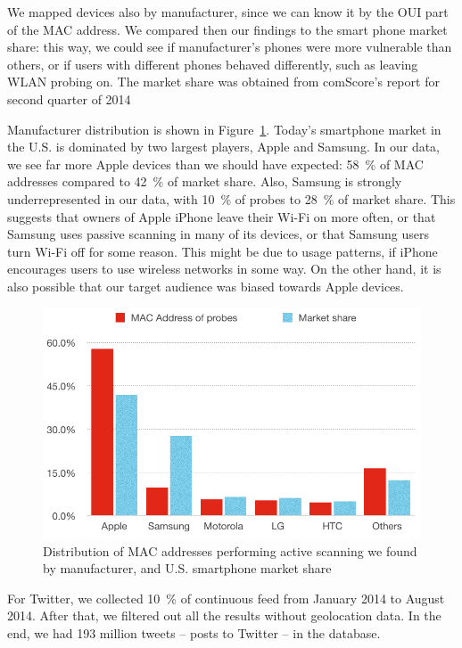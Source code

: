 \documentclass[12pt,a4paper,oneside,pdftex]{report}
\begin{document}
We mapped devices also by manufacturer, since we can know it by the OUI part of the MAC address. We compared then our findings to the smart phone market share: this way, we could see if manufacturer's phones were more vulnerable than others, or if users with different phones behaved differently, such as leaving WLAN probing on. The market share was obtained from comScore's report for second quarter of 2014~\cite{comscore2014}

Manufacturer distribution is shown in Figure~\ref{fig:manufacturers}. Today's smartphone market in the U.S. is dominated by two largest players, Apple and Samsung. In our data, we see far more Apple devices than we should have expected: 58~\% of MAC addresses compared to 42~\% of market share. Also, Samsung is strongly underrepresented in our data, with 10~\% of probes to 28~\% of market share. This suggests that owners of Apple iPhone leave their Wi-Fi on more often, or that Samsung uses passive scanning in many of its devices, or that Samsung users turn Wi-Fi off for some reason. This might be due to usage patterns, if iPhone encourages users to use wireless networks in some way. On the other hand, it is also possible that our target audience was biased towards Apple devices.

\begin{figure}
    \center
    \includegraphics{images/manufacturers}
    \caption{Distribution of MAC addresses performing active scanning we found by manufacturer, and U.S. smartphone market share\cite{comscore2014}}
    \label{fig:manufacturers}
\end{figure}

For Twitter, we collected 10~\% of continuous feed from January 2014 to August 2014. After that, we filtered out all the results without geolocation data. In the end, we had 193 million tweets -- posts to Twitter -- in the database.
\end{document}
